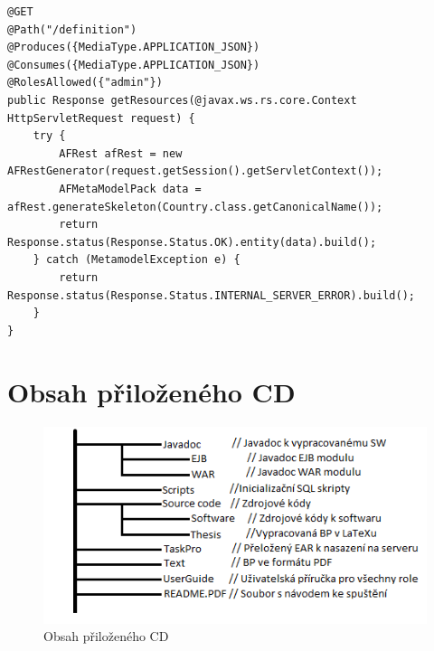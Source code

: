 \documentclass[11pt,twoside,a4paper]{book}
\begin{document}
\begin{lstlisting}[caption={Ukázka zdroje, sloužícího k vygenerování definice třídy Country},
label={code:serverDefinition}, basicstyle=\footnotesize]
@GET
@Path("/definition")
@Produces({MediaType.APPLICATION_JSON})
@Consumes({MediaType.APPLICATION_JSON})
@RolesAllowed({"admin"})
public Response getResources(@javax.ws.rs.core.Context HttpServletRequest request) {
	try {
		AFRest afRest = new AFRestGenerator(request.getSession().getServletContext());
		AFMetaModelPack data = afRest.generateSkeleton(Country.class.getCanonicalName());
		return Response.status(Response.Status.OK).entity(data).build();
	} catch (MetamodelException e) {
		return Response.status(Response.Status.INTERNAL_SERVER_ERROR).build();
	}
}
\end{lstlisting}




\chapter{Obsah přiloženého CD}

\begin{figure}[h!]
\begin{center}
\includegraphics{images/cdContent}
\caption{Obsah přiloženého CD}  
\label{img:cd}
\end{center}
\end{figure}
\end{document}

